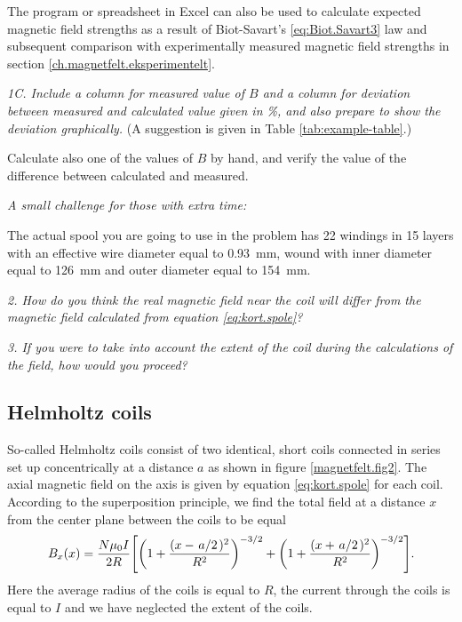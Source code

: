 \documentclass[../Elmag-labhefte-2020.tex]{subfiles}
\begin{document}
The program or spreadsheet in Excel can also be used to calculate expected magnetic field strengths as a result of Biot-Savart's \eqref{eq:Biot.Savart3} law and subsequent comparison with experimentally measured magnetic field strengths in section \ref{ch.magnetfelt.eksperimentelt}.

\emph{1C. Include a column for measured value of $B$ and a column for deviation between measured and calculated value given in \si{\percent}, and also prepare to show the deviation graphically.} (A suggestion is given in Table \ref{tab:example-table}.)

Calculate also one of the values of $B$ by hand, and verify the value of the difference between calculated and measured.

\vspace{4mm}

\emph{A small challenge for those with extra time:}

The actual spool you are going to use in the problem has 22 windings in 15 layers with an effective wire diameter equal to \SI{0.93}{\mm}, wound with inner diameter equal to \SI{126}{\mm} and outer diameter equal to \SI{154}{\mm}.

\emph{2. How do you think the real magnetic field near the coil will differ from the magnetic field calculated from equation \eqref{eq:kort.spole}?}

\emph{3. If you were to take into account the extent of the coil during the calculations of the field, how would you proceed?} 

\subsection{Helmholtz coils}

So-called Helmholtz coils
consist of two identical, short coils connected in series set up concentrically at a distance $a$ as shown in figure \ref{magnetfelt.fig2}. The axial magnetic field on the axis is given by equation \eqref{eq:kort.spole} for each coil. According to the superposition principle, we find the total field at a distance $x$ from the center plane between the coils to be equal
%
\begin{equation}
    B_x (x) 
        = \frac{N \mu_0 I}{2 R} \qty[\qty(1 + \frac{(x - \flatfrac{a}{2})^2}{R^2})^{-3/2} 
            + \qty(1 + \frac{(x + \flatfrac{a}{2})^2}{R^2})^{-3/2}].
    \label{eq:Helmholtz}
\end{equation}
%
Here the average radius of the coils is equal to $R$, the current through the coils is equal to $I$ and we have neglected the extent of the coils.
\end{document}
